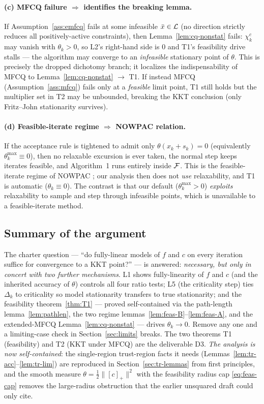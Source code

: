 \paragraph{(c) MFCQ failure $\Rightarrow$ identifies the breaking lemma.}
If Assumption~\ref{ass:emfcq} fails at some infeasible $\bar x\in\mathcal{L}$
(no direction strictly reduces all positively-active constraints), then
Lemma~\ref{lem:cq-nonstat} fails: $\chi_k^c$ may vanish with $\theta_k>0$, so L2's
right-hand side is $0$ and T1's feasibility drive stalls --- the algorithm may
converge to an \emph{infeasible} stationary point of $\theta$. This is precisely
the dropped dichotomy branch; it localizes the indispensability of MFCQ to
Lemma~\ref{lem:cq-nonstat} $\to$ T1. If instead MFCQ (Assumption~\ref{ass:mfcq})
fails only at a \emph{feasible} limit point, T1 still holds but the multiplier set
in T2 may be unbounded, breaking the KKT conclusion (only Fritz--John stationarity
survives).

\paragraph{(d) Feasible-iterate regime $\Rightarrow$ NOWPAC relation.}
If the acceptance rule is tightened to admit only $\theta(x_k+s_k)=0$ (equivalently
$\theta_k^{\max}\equiv0$), then no relaxable excursion is ever taken, the normal
step keeps iterates feasible, and Algorithm~1 runs entirely inside $\mathcal{F}$. This is
the feasible-iterate regime of NOWPAC \citep{AugustinMarzouk2017,Menhorn2022};
our analysis then does not \emph{use} relaxability, and T1 is automatic
($\theta_k\equiv0$). The contrast is that our default ($\theta_k^{\max}>0$)
\emph{exploits} relaxability to sample and step through infeasible points, which is
unavailable to a feasible-iterate method.

\subsection{Summary of the argument}
\label{sec:summary}

The charter question --- ``do fully-linear models of $f$ and $c$ on every iteration
suffice for convergence to a KKT point?'' --- is answered: \emph{necessary, but
only in concert with two further mechanisms}. L1 shows fully-linearity of $f$ and
$c$ (and the inherited accuracy of $\theta$) controls all four ratio tests; L5
(the criticality step) ties $\Delta_k$ to criticality so model stationarity
transfers to true stationarity; and the feasibility theorem~\ref{thm:T1} ---
proved self-contained via the path-length lemma~\ref{lem:pathlen}, the two
regime lemmas~\ref{lem:feas-B}--\ref{lem:feas-A}, and the extended-MFCQ
Lemma~\ref{lem:cq-nonstat} --- drives $\theta_k\to0$. Remove any one and a
limiting-case check in Section~\ref{sec:limits} breaks. The two theorems T1
(feasibility) and T2 (KKT under MFCQ) are the deliverable D3. \emph{The analysis is
now self-contained}: the single-region trust-region facts it needs
(Lemmas~\ref{lem:tr-acc}--\ref{lem:tr-lim}) are reproduced in
Section~\ref{sec:tr-lemmas} from first principles, and the smooth measure
$\theta=\tfrac12\|[c]_+\|^2$ with the feasibility radius cap \eqref{eq:feas-cap}
removes the large-radius obstruction that the earlier unsquared draft could only cite.
